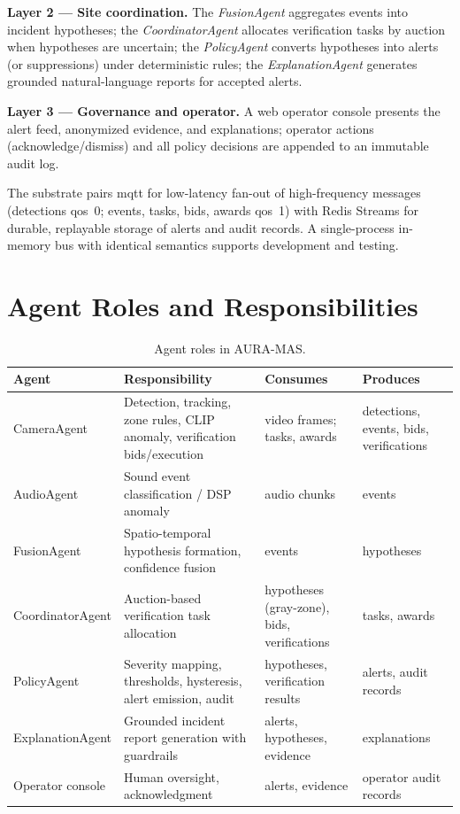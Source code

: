 \textbf{Layer 2 --- Site coordination.} The \emph{FusionAgent} aggregates events into incident hypotheses; the \emph{CoordinatorAgent} allocates verification tasks by auction when hypotheses are uncertain; the \emph{PolicyAgent} converts hypotheses into alerts (or suppressions) under deterministic rules; the \emph{ExplanationAgent} generates grounded natural-language reports for accepted alerts.

\textbf{Layer 3 --- Governance and operator.} A web operator console presents the alert feed, anonymized evidence, and explanations; operator actions (acknowledge/dismiss) and all policy decisions are appended to an immutable audit log.

The substrate pairs \gls{mqtt} \cite{light2017mosquitto} for low-latency fan-out of high-frequency messages (detections \gls{qos}~0; events, tasks, bids, awards \gls{qos}~1) with Redis Streams for durable, replayable storage of alerts and audit records. A single-process in-memory bus with identical semantics supports development and testing.

\section{Agent Roles and Responsibilities}

\begin{table}[H]
\centering
\caption{Agent roles in AURA-MAS.}
\label{tab:agents}
\small
\begin{tabular}{p{2.8cm}p{4.6cm}p{2.6cm}p{2.6cm}}
\toprule
\textbf{Agent} & \textbf{Responsibility} & \textbf{Consumes} & \textbf{Produces} \\
\midrule
CameraAgent & Detection, tracking, zone rules, CLIP anomaly, verification bids/execution & video frames; tasks, awards & detections, events, bids, verifications \\
AudioAgent & Sound event classification / DSP anomaly & audio chunks & events \\
FusionAgent & Spatio-temporal hypothesis formation, confidence fusion & events & hypotheses \\
CoordinatorAgent & Auction-based verification task allocation & hypotheses (gray-zone), bids, verifications & tasks, awards \\
PolicyAgent & Severity mapping, thresholds, hysteresis, alert emission, audit & hypotheses, verification results & alerts, audit records \\
ExplanationAgent & Grounded incident report generation with guardrails & alerts, hypotheses, evidence & explanations \\
Operator console & Human oversight, acknowledgment & alerts, evidence & operator audit records \\
\bottomrule
\end{tabular}
\end{table}

